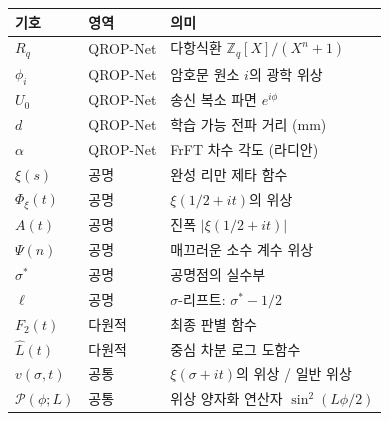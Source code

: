 \documentclass[11pt, a4paper]{article}
\theoremstyle{definition}
\theoremstyle{plain}
\newcommand{\Zq}{\mathbb{Z}_q}
\newcommand{\xif}{\xi}
\newcommand{\Phiz}{\Phi_\xi}
\newcommand{\Ampl}{A}
\newcommand{\Psip}{\Psi}
\newcommand{\Lhat}{\hat{L}}
\begin{document}
\begin{center}
\small
\begin{tabular}{lll}
\toprule
\textbf{기호} & \textbf{영역} & \textbf{의미} \\
\midrule
$R_q$ & QROP-Net & 다항식환 $\Zq[X]/(X^n+1)$ \\
$\phi_i$ & QROP-Net & 암호문 원소 $i$의 광학 위상 \\
$U_0$ & QROP-Net & 송신 복소 파면 $e^{i\phi}$ \\
$d$ & QROP-Net & 학습 가능 전파 거리 (mm) \\
$\alpha$ & QROP-Net & FrFT 차수 각도 (라디안) \\
$\xif(s)$ & 공명 & 완성 리만 제타 함수 \\
$\Phiz(t)$ & 공명 & $\xif(1/2+it)$의 위상 \\
$\Ampl(t)$ & 공명 & 진폭 $|\xif(1/2+it)|$ \\
$\Psip(n)$ & 공명 & 매끄러운 소수 계수 위상 \\
$\sigma^*$ & 공명 & 공명점의 실수부 \\
$\ell$ & 공명 & $\sigma$-리프트: $\sigma^* - 1/2$ \\
$F_2(t)$ & 다원적 & 최종 판별 함수 \\
$\Lhat(t)$ & 다원적 & 중심 차분 로그 도함수 \\
$v(\sigma,t)$ & 공통 & $\xif(\sigma+it)$의 위상 / 일반 위상 \\
$\mathcal{P}(\phi;L)$ & 공통 & 위상 양자화 연산자 $\sin^2(L\phi/2)$ \\
\bottomrule
\end{tabular}
\end{center}
\end{document}
